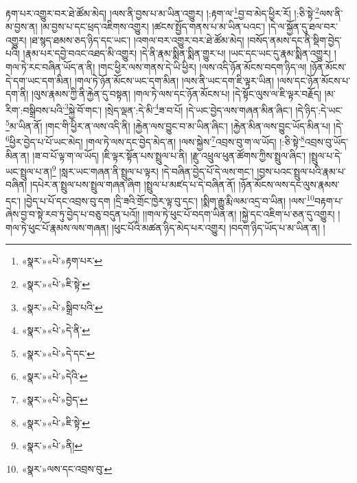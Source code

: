 རྟག་པར་འགྱུར་བར་ཐེ་ཚོམ་མེད། །ལས་ནི་བྱས་པ་མ་ཡིན་འགྱུར། །:རྟག་ལ་\footnote{«སྣར་»«པེ་»རྟག་པར་}བྱ་བ་མེད་ཕྱིར་རོ། །:ཅི་སྟེ་\footnote{«སྣར་»«པེ་»ཇི་སྟེ་}ལས་ནི་མ་བྱས་ན། །མ་བྱས་པ་དང་ཕྲད་འཇིགས་འགྱུར། །ཚངས་སྤྱོད་གནས་པ་མ་ཡིན་པའང་། །དེ་ལ་སྐྱོན་དུ་ཐལ་བར་འགྱུར། །ཐ་སྙད་ཐམས་ཅད་ཉིད་དང་ཡང་། །འགལ་བར་འགྱུར་བར་ཐེ་ཚོམ་མེད། །བསོད་ནམས་དང་ནི་སྡིག་བྱེད་པའི། །རྣམ་པར་དབྱེ་བའང་འཐད་མི་འགྱུར། །དེ་ནི་རྣམ་སྨིན་སྨིན་གྱུར་པ། །ཡང་དང་ཡང་དུ་རྣམ་སྨིན་འགྱུར། །གལ་ཏེ་རང་བཞིན་ཡོད་ན་ནི། །གང་ཕྱིར་ལས་གནས་དེ་ཡི་ཕྱིར། །ལས་འདི་ཉོན་མོངས་བདག་ཉིད་ལ། །ཉོན་མོངས་དེ་དག་ཡང་དག་མིན། །གལ་ཏེ་ཉོན་མོངས་ཡང་དག་མིན། །ལས་ནི་ཡང་དག་ཇི་ལྟར་ཡིན། །ལས་དང་ཉོན་མོངས་པ་དག་ནི། །ལུས་རྣམས་ཀྱི་ནི་རྐྱེན་དུ་བསྟན། །གལ་ཏེ་ལས་དང་ཉོན་མོངས་པ། །དེ་སྟོང་ལུས་ལ་ཇི་ལྟར་བརྗོད། །མ་རིག་:བསྒྲིབས་པའི་\footnote{«སྣར་»«པེ་»སྒྲིབ་པའི་}སྐྱེ་བོ་གང་། །སྲེད་ལྡན་:དེ་མི་\footnote{«སྣར་»«པེ་»དེ་ནི་}ཟ་བ་པོ། །དེ་ཡང་བྱེད་ལས་གཞན་མིན་ཞིང་། །དེ་ཉིད་:དེ་ཡང་\footnote{«སྣར་»«པེ་»དེ་དང་}མ་ཡིན་ནོ། །གང་གི་ཕྱིར་ན་ལས་འདི་ནི། །རྐྱེན་ལས་བྱུང་བ་མ་ཡིན་ཞིང་། །རྐྱེན་མིན་ལས་བྱུང་ཡོད་མིན་པ། །དེ་\footnote{«སྣར་»«པེ་»དེའི་}ཕྱིར་བྱེད་པ་པོ་ཡང་མེད། །གལ་ཏེ་ལས་དང་བྱེད་མེད་ན། །ལས་སྐྱེས་\footnote{«སྣར་»«པེ་»བྱེད་}འབྲས་བུ་ག་ལ་ཡོད། །:ཅི་སྟེ་\footnote{«སྣར་»«པེ་»ཇི་སྟེ་}འབྲས་བུ་ཡོད་མིན་ན། །ཟ་བ་པོ་ལྟ་ག་ལ་ཡོད། །ཇི་ལྟར་སྟོན་པས་སྤྲུལ་པ་ནི། །རྫུ་འཕྲུལ་ཕུན་ཚོགས་ཀྱིས་སྤྲུལ་ཞིང་། །སྤྲུལ་པ་དེ་ཡང་སྤྲུལ་པ་ན།\footnote{«སྣར་»«པེ་»ནི།} །སླར་ཡང་གཞན་ནི་སྤྲུལ་པ་ལྟར། །དེ་བཞིན་བྱེད་པོ་དེ་ལས་གང་། །བྱས་པའང་སྤྲུལ་པའི་རྣམ་པ་བཞིན། །དཔེར་ན་སྤྲུལ་པས་སྤྲུལ་གཞན་ཞིག །སྤྲུལ་པ་མཛད་པ་དེ་བཞིན་ནོ། །ཉོན་མོངས་ལས་དང་ལུས་རྣམས་དང་། །བྱེད་པ་པོ་དང་འབྲས་བུ་དག །དྲི་ཟའི་གྲོང་ཁྱེར་ལྟ་བུ་དང་། །སྨིག་རྒྱུ་རྨི་ལམ་འདྲ་བ་ཡིན། །ལས་\footnote{«སྣར་»ལས་དང་འབྲས་བུ་}བརྟག་པ་ཞེས་བྱ་བ་སྟེ་རབ་ཏུ་བྱེད་པ་བཅུ་བདུན་པའོ།། །།གལ་ཏེ་ཕུང་པོ་བདག་ཡིན་ན། །སྐྱེ་དང་འཇིག་པ་ཅན་དུ་འགྱུར། །གལ་ཏེ་ཕུང་པོ་རྣམས་ལས་གཞན། །ཕུང་པོའི་མཚན་ཉིད་མེད་པར་འགྱུར། །བདག་ཉིད་ཡོད་པ་མ་ཡིན་ན། །
